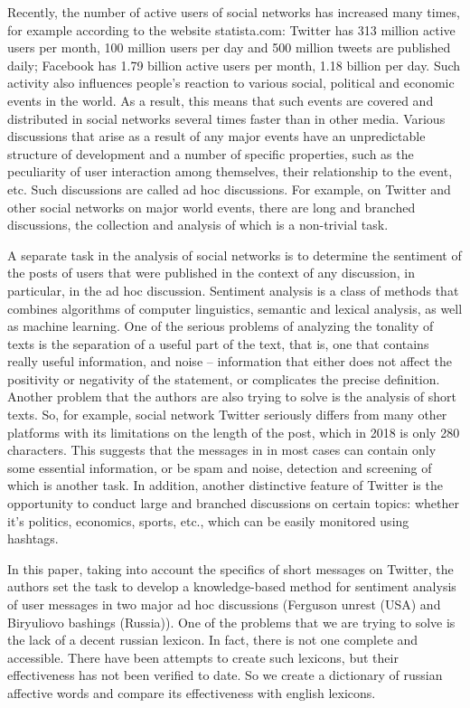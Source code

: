 Recently, the number of active users of social networks has increased many times, for example according to the website statista.com: Twitter has 313 million active users per month, 100 million users per day and 500 million tweets are published daily; Facebook has 1.79 billion active users per month, 1.18 billion per day. Such activity also influences people’s reaction to various social, political and economic events in the world. As a result, this means that such events are covered and distributed in social networks several times faster than in other media. Various discussions that arise as a result of any major events have an unpredictable structure of development and a number of specific properties, such as the peculiarity of user interaction among themselves, their relationship to the event, etc. Such discussions are called ad hoc discussions. For example, on Twitter and other social networks on major world events, there are long and branched discussions, the collection and analysis of which is a non-trivial task.

A separate task in the analysis of social networks is to determine the sentiment of the posts of users that were published in the context of any discussion, in particular, in the ad hoc discussion. Sentiment analysis \cite{Liu} is a class of methods that combines algorithms of computer linguistics, semantic and lexical analysis, as well as machine learning. One of the serious problems of analyzing the tonality of texts is the separation of a useful part of the text, that is, one that contains really useful information, and noise -- information that either does not affect the positivity or negativity of the statement, or complicates the precise definition. Another problem that the authors are also trying to solve is the analysis of short texts. So, for example, social network Twitter seriously differs from many other platforms with its limitations on the length of the post, which in 2018 is only 280 characters. This suggests that the messages in in most cases can contain only some essential information, or be spam and noise, detection and screening of which is another task. In addition, another distinctive feature of Twitter is the opportunity to conduct large and branched discussions on certain topics: whether it’s politics, economics, sports, etc., which can be easily monitored using hashtags.

In this paper, taking into account the specifics of short messages on Twitter, the authors set the task to develop a knowledge-based method for sentiment analysis of user messages in two major ad hoc discussions (Ferguson unrest (USA) and Biryuliovo bashings (Russia)). One of the problems that we are trying to solve is the lack of a decent russian lexicon. In fact, there is not one complete and accessible. There have been attempts to create such lexicons, but their effectiveness has not been verified to date. So we create a dictionary of russian affective words and compare its effectiveness with english lexicons.

